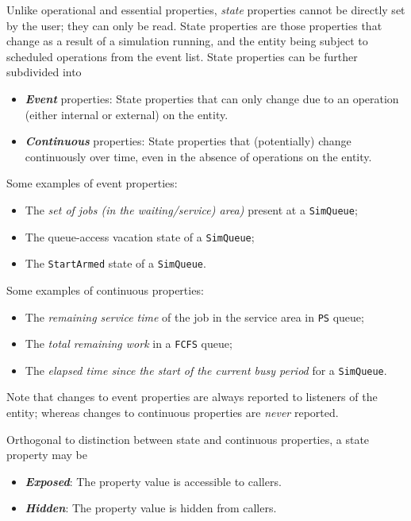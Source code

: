 \documentclass[12pt]{book}
\begin{document}
Unlike operational and essential properties,
  {\em state\/} properties cannot be directly set by the user;
  they can only be read.
State properties are those properties that change
  as a result of a simulation running,
  and the entity being subject to scheduled operations from the event list.
State properties can be further subdivided into
\begin{itemize}
\item {\em\bf Event\/} properties: State properties that can only change due
                                     to an operation (either internal or external)
                                     on the entity.
\item {\em\bf Continuous\/} properties: State properties that (potentially) change
                                          continuously over time,
                                          even in the absence of operations on the entity.
\end{itemize}
Some examples of event properties:
\begin{itemize}
\item The {\em set of jobs (in the waiting/service) area)\/} present at a \lstinline-SimQueue-;
\item The queue-access vacation state of a \lstinline-SimQueue-;
\item The \lstinline-StartArmed- state of a \lstinline-SimQueue-.
\end{itemize}
Some examples of continuous properties:
\begin{itemize}
\item The {\em remaining service time\/} of the job in the service area in \lstinline-PS- queue;
\item The {\em total remaining work\/} in a \lstinline-FCFS- queue;
\item The {\em elapsed time since the start of the current busy period\/} for a \lstinline-SimQueue-.
\end{itemize}
Note that changes to event properties are always reported to listeners of the entity;
  whereas changes to continuous properties are {\em never\/} reported.

Orthogonal to distinction between state and continuous properties,
  a state property may be
\begin{itemize}
  \item {\em\bf Exposed\/}: The property value is accessible to callers.
  \item {\em\bf Hidden\/}:  The property value is hidden from callers.
\end{itemize}
\end{document}
